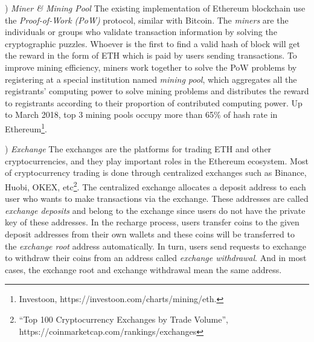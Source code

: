 ) \emph{Miner \& Mining Pool}
The existing implementation of Ethereum blockchain use the \emph{Proof-of-Work (PoW)} protocol, similar with Bitcoin. The \emph{miners} are the individuals or groups who validate transaction information by solving the cryptographic puzzles. Whoever is the first to find a valid hash of block will get the reward in the form of ETH which is paid by users sending transactions. To improve mining efficiency, miners work together to solve the PoW problems by registering at a special institution named \emph{mining pool}, which aggregates all the registrants' computing power to solve mining problems and distributes the reward to registrants according to their proportion of contributed computing power. Up to March 2018, top $3$ mining pools occupy more than 65\% of hash rate in Ethereum\footnote{Investoon, https://investoon.com/charts/mining/eth.}.

) \emph{Exchange}
The exchanges are the platforms for trading ETH and other cryptocurrencies, and they play important roles in the Ethereum ecosystem. Most of cryptocurrency trading is done through centralized exchanges such as Binance, Huobi, OKEX, etc\footnote{``Top 100 Cryptocurrency Exchanges by Trade Volume'', https://coinmarketcap.com/rankings/exchanges}. The centralized exchange allocates a deposit address to each user who wants to make transactions via the exchange. These addresses are called \emph{exchange deposits} and belong to the exchange since users do not have the private key of these addresses. In the recharge process, users transfer coins to the given deposit addresses from their own wallets and these coins will be transferred to the \emph{exchange root} address automatically. In turn, users send requests to exchange to withdraw their coins from an address called \emph{exchange withdrawal}. And in most cases, the exchange root and exchange withdrawal mean the same address.




